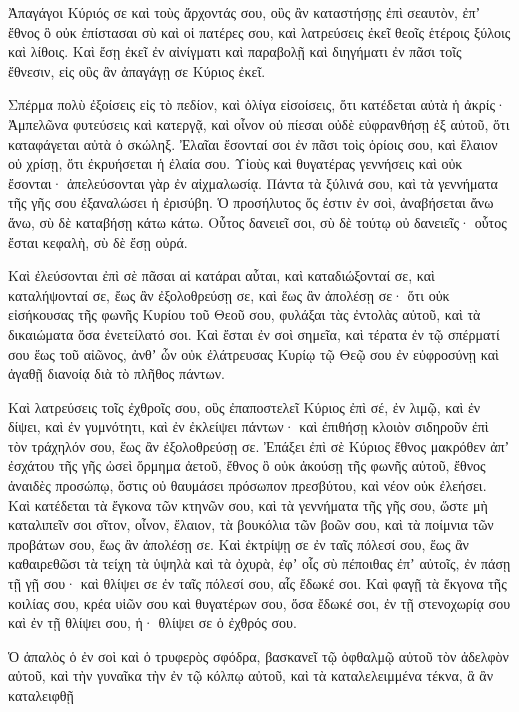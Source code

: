 {\par }{\PP {}Ἀπαγάγοι Κύριός σε καὶ τοὺς ἄρχοντάς σου, οὓς ἂν καταστήσῃς ἐπὶ σεαυτὸν, ἐπʼ ἔθνος ὃ οὐκ ἐπίστασαι σὺ καὶ οἱ πατέρες σου, καὶ λατρεύσεις ἐκεῖ θεοῖς ἑτέροις ξύλοις καὶ λίθοις.
Καὶ ἔσῃ ἐκεῖ ἐν αἰνίγματι καὶ παραβολῇ καὶ διηγήματι ἐν πᾶσι τοῖς ἔθνεσιν, εἰς οὓς ἂν ἀπαγάγῃ σε Κύριος ἐκεῖ.
\par }{\PP {}Σπέρμα πολὺ ἐξοίσεις εἰς τὸ πεδίον, καὶ ὀλίγα εἰσοίσεις, ὅτι κατέδεται αὐτὰ ἡ ἀκρίς·
Ἀμπελῶνα φυτεύσεις καὶ κατεργᾷ, καὶ οἶνον οὐ πίεσαι οὐδὲ εὐφρανθήσῃ ἐξ αὐτοῦ, ὅτι καταφάγεται αὐτὰ ὁ σκώληξ.
Ἐλαῖαι ἔσονταί σοι ἐν πᾶσι τοὶς ὁρίοις σου, καὶ ἔλαιον οὐ χρίσῃ, ὅτι ἐκρυήσεται ἡ ἐλαία σου.
Υἱοὺς καὶ θυγατέρας γεννήσεις καὶ οὐκ ἔσονται· ἀπελεύσονται γὰρ ἐν αἰχμαλωσίᾳ.
Πάντα τὰ ξύλινά σου, καὶ τὰ γεννήματα τῆς γῆς σου ἐξαναλώσει ἡ ἐρισύβη.
Ὁ προσήλυτος ὅς ἐστιν ἐν σοὶ, ἀναβήσεται ἄνω ἄνω, σὺ δὲ καταβήσῃ κάτω κάτω.
Οὗτος δανειεῖ σοι, σὺ δὲ τούτῳ οὐ δανειεῖς· οὗτος ἔσται κεφαλὴ, σὺ δὲ ἔσῃ οὐρά.
\par }{\PP {}Καὶ ἐλεύσονται ἐπὶ σὲ πᾶσαι αἱ κατάραι αὗται, καὶ καταδιώξονταί σε, καὶ καταλήψονταί σε, ἔως ἂν ἐξολοθρεύσῃ σε, καὶ ἕως ἂν ἀπολέσῃ σε· ὅτι οὐκ εἰσήκουσας τῆς φωνῆς Κυρίου τοῦ Θεοῦ σου, φυλάξαι τὰς ἐντολὰς αὐτοῦ, καὶ τὰ δικαιώματα ὅσα ἐνετείλατό σοι.
Καὶ ἔσται ἐν σοὶ σημεῖα, καὶ τέρατα ἐν τῷ σπέρματί σου ἕως τοῦ αἰῶνος,
ἀνθʼ ὧν οὐκ ἐλάτρευσας Κυρίῳ τῷ Θεῷ σου ἐν εὐφροσύνῃ καὶ ἀγαθῇ διανοίᾳ διὰ τὸ πλῆθος πάντων.
\par }{\PP {}Καὶ λατρεύσεις τοῖς ἐχθροῖς σου, οὓς ἐπαποστελεῖ Κύριος ἐπὶ σέ, ἐν λιμῷ, καὶ ἐν δίψει, καὶ ἐν γυμνότητι, καὶ ἐν ἐκλείψει πάντων· καὶ ἐπιθήσῃ κλοιὸν σιδηροῦν ἐπὶ τὸν τράχηλόν σου, ἕως ἂν ἐξολοθρεύσῃ σε.
Ἐπάξει ἐπὶ σὲ Κύριος ἔθνος μακρόθεν ἀπʼ ἐσχάτου τῆς γῆς ὡσεὶ ὅρμημα ἀετοῦ, ἔθνος ὃ οὐκ ἀκούσῃ τῆς φωνῆς αὐτοῦ,
ἔθνος ἀναιδὲς προσώπῳ, ὅστις οὐ θαυμάσει πρόσωπον πρεσβύτου, καὶ νέον οὐκ ἐλεήσει.
Καὶ κατέδεται τὰ ἔγκονα τῶν κτηνῶν σου, καὶ τὰ γεννήματα τῆς γῆς σου, ὥστε μὴ καταλιπεῖν σοι σῖτον, οἶνον, ἔλαιον, τὰ βουκόλια τῶν βοῶν σου, καὶ τὰ ποίμνια τῶν προβάτων σου, ἕως ἂν ἀπολέσῃ σε.
Καὶ ἐκτρίψῃ σε ἐν ταῖς πόλεσί σου, ἕως ἂν καθαιρεθῶσι τὰ τείχη τὰ ὑψηλὰ καὶ τὰ ὀχυρὰ, ἐφʼ οἷς σὺ πέποιθας ἐπʼ αὐτοῖς, ἐν πάσῃ τῇ γῇ σου· καὶ θλίψει σε ἐν ταῖς πόλεσί σου, αἷς ἔδωκέ σοι.
Καὶ φαγῇ τὰ ἔκγονα τῆς κοιλίας σου, κρέα υἱῶν σου καὶ θυγατέρων σου, ὅσα ἔδωκέ σοι, ἐν τῇ στενοχωρίᾳ σου καὶ ἐν τῇ θλίψει σου, ἡ· θλίψει σε ὁ ἐχθρός σου.
\par }{\PP {}Ὁ ἁπαλὸς ὁ ἐν σοὶ καὶ ὁ τρυφερὸς σφόδρα, βασκανεῖ τῷ ὀφθαλμῷ αὐτοῦ τὸν ἀδελφὸν αὐτοῦ, καὶ τὴν γυναῖκα τὴν ἐν τῷ κόλπῳ αὐτοῦ, καὶ τὰ καταλελειμμένα τέκνα, ἃ ἂν καταλειφθῇ
}
